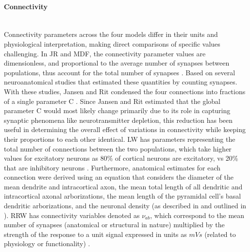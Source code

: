 \documentclass[12pt,twoside]{article}
\begin{document}
\paragraph{Connectivity}~\\
Connectivity parameters across the four models differ in their units and physiological interpretation, making direct comparisons of specific values challenging. In JR and MDF, the connectivity parameter values are dimensionless, and proportional to the average number of synapses between populations, thus account for the total number of synapses \citep{jansen1995electroencephalogram}. Based on several neuroanatomical studies \citep{braitenberg2013cortex, larkman1991dendritic, liu1991distribution, elhanany1990intrinsic} that estimated these quantities by counting synapses. With these studies, Jansen and Rit condensed the four connections into fractions of a single parameter C \citep{grimbert2006bifurcation}. Since Jansen and Rit estimated that the global parameter C would most likely change primarily due to its role in capturing synaptic phenomena like neurotransmitter depletion, this reduction has been useful in determining the overall effect of variations in connectivity while keeping their proportions to each other identical. LW has parameters representing the total number of connections between the two populations, which take higher values for excitatory neurons as 80\% of cortical neurons are excitatory, vs 20\% that are inhibitory neurons \citep{cook2021neural}. Furthermore, anatomical estimates for each connection were derived using an equation that considers the diameter of the mean dendrite and intracortical axon, the mean total length of all dendritic and intracortical axonal arborizations, the mean length of the pyramidal cell's basal dendritic arborizations, and the neuronal density (as described in \citealp{liley2001spatially} and outlined in \citealp{liley1994intracortical}). RRW has connectivity variables denoted as $\nu_{ab}$, which correspond to the mean number of synapses (anatomical or structural in nature) multiplied by the strength of the response to a unit signal expressed in units as $mVs$ (related to physiology or functionality) \citep{rennie1999effects, robinson1997propagation, rall1967distinguishing}. 
 
\end{document}
